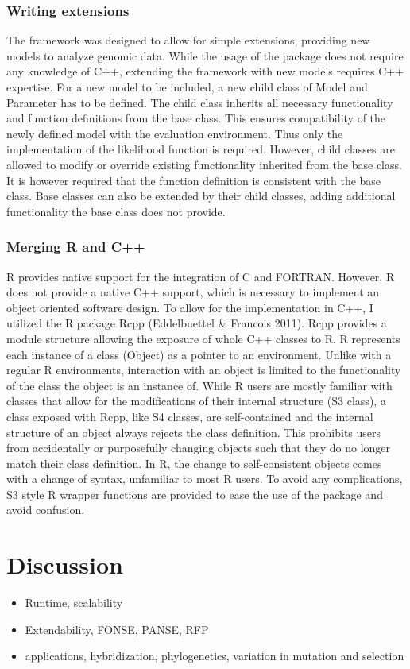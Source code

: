 \documentclass{bioinfo}
\begin{document}
\subsubsection{Writing extensions}
The framework was designed to allow for simple extensions, providing new models to analyze genomic data. 
While the usage of the package does not require any knowledge of C++, extending the framework with new models requires C++ expertise. 
For a new model to be included, a new child class of Model and Parameter has to be defined.
The child class inherits all necessary functionality and function definitions from the base class. This ensures compatibility of the newly defined model with the evaluation environment.
Thus only the implementation of the likelihood function is required. 
However, child classes are allowed to modify or override existing functionality inherited from the base class. 
It is however required that the function definition is consistent with the base class. 
Base classes can also be extended by their child classes, adding additional functionality the base class does not provide.
\subsubsection{Merging R and C++}
R provides native support for the integration of C and FORTRAN. 
However, R does not provide a native C++ support, which is necessary to implement an object oriented software design. 
To allow for the implementation in C++, I utilized the R package Rcpp (Eddelbuettel \& Francois 2011). 
Rcpp provides a module structure allowing the exposure of whole C++ classes to R. 
R represents each instance of a class (Object) as a pointer to an environment. 
Unlike with a regular R environments, interaction with an object is limited to the functionality of the class the object is an instance of.
While R users are mostly familiar with classes that allow for the modifications of their internal structure (S3 class), a class exposed with Rcpp, like S4 classes, are self-contained and the internal structure of an object always rejects the class definition. 
This prohibits users from accidentally or purposefully changing objects such that they do no longer match their class definition.
In R, the change to self-consistent objects comes with a change of syntax, unfamiliar to most R users. 
To avoid any complications, S3 style R wrapper functions are provided to ease the use of the package and avoid confusion.

\section*{Discussion}
\begin{itemize}
\item Runtime, scalability
\item Extendability, FONSE, PANSE, RFP
\item applications, hybridization, phylogenetics, variation in mutation and selection
\end{itemize}

%
%
\end{document}
